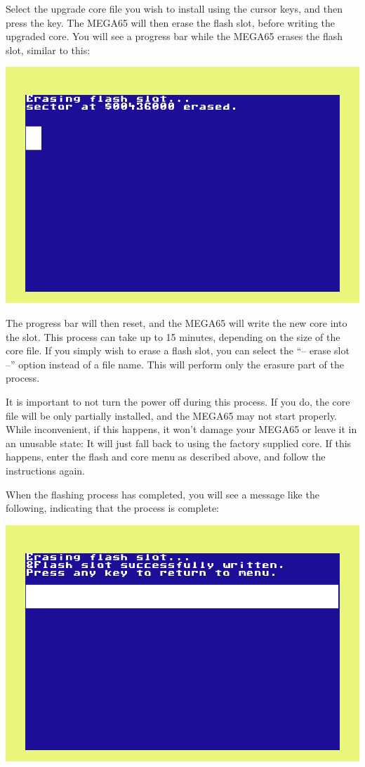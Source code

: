 Select the upgrade core file you wish to
install using the cursor keys, and then press the  key.  The MEGA65 will then erase
the flash slot, before writing the upgraded core.  You will see a progress bar while the MEGA65 erases
the flash slot, similar to this:

\includegraphics[width=\linewidth]{images/ss-flashmenu-erasing.png}

The progress bar will then reset, and the MEGA65 will
write the new core into the slot. This process can take up to 15
minutes, depending on the size of the core file.  If you simply wish
to erase a flash slot, you can select the
``-- erase slot --'' option instead of a file name. This will perform
only the erasure part of the process.

It is important to not turn the power off during this process. If you do, the core file will be
only partially installed, and the MEGA65 may not start properly.
While
inconvenient, if this happens, it won't damage your MEGA65 or leave it
in an unusable state: It will just fall back to using the factory
supplied core.
If this happens, enter the flash and core
menu as described above, and follow the instructions again.

When the flashing process has completed, you will see a message like the following, indicating that the process is complete:

\includegraphics[width=\linewidth]{images/ss-flashmenu-done.png}


